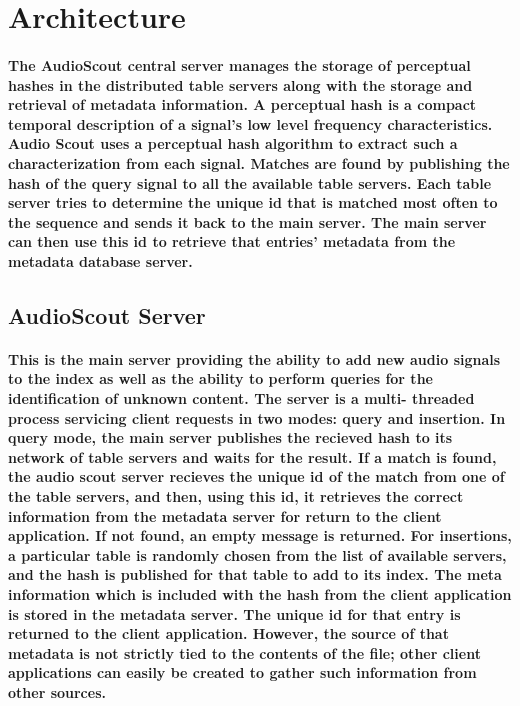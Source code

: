 \documentclass[11pt, a4paper]{article}
\begin{document}
\section{Architecture}
\paragraph{The AudioScout central server manages the storage of perceptual hashes in the distributed table
servers along with the storage and retrieval of metadata information.  A perceptual hash is a 
compact temporal description of a signal's low level frequency characteristics. Audio Scout uses a
perceptual hash algorithm to extract such a characterization from  each signal.  Matches are 
found by publishing the hash 
of the query signal to all the available table servers.  Each table server tries to 
determine the unique id that is matched most often to the sequence and sends it back to the main 
server.  The main server can then use this id to retrieve that entries' metadata from the metadata 
database server.}

\subsection{AudioScout Server}
\paragraph{This is the main server providing the ability to add new audio signals to the index as well as 
the ability to perform queries for the identification of unknown content.  The server is a multi-
threaded process servicing client requests in two modes: query and insertion. In query mode,
 the main server publishes the recieved hash to its network of table servers and waits for the 
result.  If a match is found, the audio scout server recieves the unique id of the match from one
of the table servers, and then, using this id, it retrieves the correct information from the 
metadata server for return to the client application.  If not found, an empty message is
 returned.  
For insertions, a particular table is randomly chosen from the list of available servers, and 
the hash is published for that table to add to its index.  The meta information which is included 
with the hash from the client application is stored in the metadata server.  The unique id for 
that entry is returned to the client application.  However, the source of that metadata is not 
strictly tied to the contents of the file;  other client applications can easily be created 
to gather such information from other sources.}
\end{document}
